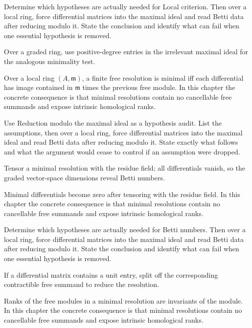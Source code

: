 \begin{exercise}\label{exr:v25-02}
Determine which hypotheses are actually needed for Local criterion. Then over a local ring, force differential matrices into the maximal ideal and read Betti data after reducing modulo it. State the conclusion and identify what can fail when one essential hypothesis is removed.
\end{exercise}
\begin{hint}
Over a graded ring, use positive-degree entries in the irrelevant maximal ideal for the analogous minimality test.
\end{hint}
\begin{solution}
Over a local ring $(A,\mathfrak m)$, a finite free resolution is minimal iff each differential has image contained in $\mathfrak m$ times the previous free module. In this chapter the concrete consequence is that minimal resolutions contain no cancellable free summands and expose intrinsic homological ranks.
\end{solution}

\begin{exercise}\label{exr:v25-03}
Use Reduction modulo the maximal ideal as a hypothesis audit. List the assumptions, then over a local ring, force differential matrices into the maximal ideal and read Betti data after reducing modulo it. State exactly what follows and what the argument would cease to control if an assumption were dropped.
\end{exercise}
\begin{hint}
Tensor a minimal resolution with the residue field; all differentials vanish, so the graded vector-space dimensions reveal Betti numbers.
\end{hint}
\begin{solution}
Minimal differentials become zero after tensoring with the residue field. In this chapter the concrete consequence is that minimal resolutions contain no cancellable free summands and expose intrinsic homological ranks.
\end{solution}

\begin{exercise}\label{exr:v25-04}
Determine which hypotheses are actually needed for Betti numbers. Then over a local ring, force differential matrices into the maximal ideal and read Betti data after reducing modulo it. State the conclusion and identify what can fail when one essential hypothesis is removed.
\end{exercise}
\begin{hint}
If a differential matrix contains a unit entry, split off the corresponding contractible free summand to reduce the resolution.
\end{hint}
\begin{solution}
Ranks of the free modules in a minimal resolution are invariants of the module. In this chapter the concrete consequence is that minimal resolutions contain no cancellable free summands and expose intrinsic homological ranks.
\end{solution}

